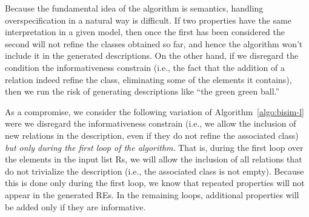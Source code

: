 Because the fundamental idea of the algorithm is semantics, handling overspecification in 
a natural way is difficult. If two properties have the same interpretation in a given 
model, then once the first has been considered the second will not refine the classes 
obtained so far, and hence the algorithm won't include it in the generated descriptions. 
On the other hand, if we disregard the condition the informativeness constrain (i.e., 
the fact that the addition of a relation indeed refine the class, eliminating some of 
the elements it contains), then we run the risk of generating descriptions like ``the green 
green ball.''

As a compromise, we consider the following variation of Algorithm~\ref{algo:bisim-l} were 
we disregard the informativeness constrain (i.e., we allow the inclusion of new relations 
in the description, even if they do not refine the associated class) \emph{but only during the 
first loop of the algorithm}.  That is, during the first loop over the elements in the 
input list Rs, we will allow the inclusion of all relations that do not trivialize the 
description (i.e., the associated class is not empty).  Because this is done only during 
the first loop, we know that repeated properties will not appear in the generated REs.  
In the remaining loops, additional properties will be added only if they are informative. 




